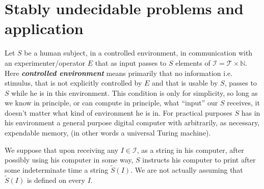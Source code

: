 \documentclass{amsart}  %
\numberwithin{equation}{section}
\theoremstyle{definition}
\theoremstyle{remark}
\begin{document}
{\section{Stably undecidable problems and application} \label{section:systemMpm}
Let $S$ be a human subject, in a controlled environment, in communication with an experimenter/operator $E$ that as input passes to $S$ elements of $\mathcal{I} = \mathcal{T} \times \mathbb{N}$. Here \textbf{\emph{controlled environment}} means primarily that no information i.e. stimulus,
that is not explicitly controlled by $E$ and that is usable by $S$, passes to $S$ while he is in this environment. This condition is only for simplicity, 
so long as we know in principle, or can compute in principle, what ``input'' our $S$ receives, it doesn't matter what kind of environment he is in. For practical purposes $S$ has in his environment a general purpose digital computer with arbitrarily, as necessary, expendable memory, (in other words a universal Turing machine). 

We suppose that upon receiving any ${I} \in \mathcal{I} $, as a string in his computer, after possibly using his computer in some way,  $S$ instructs his computer to print after some indeterminate time a string $\widetilde{S}  (I)$.
We are not actually assuming that $\widetilde{S}  (I)$ is defined on every $I$.  

}
\end{document}
